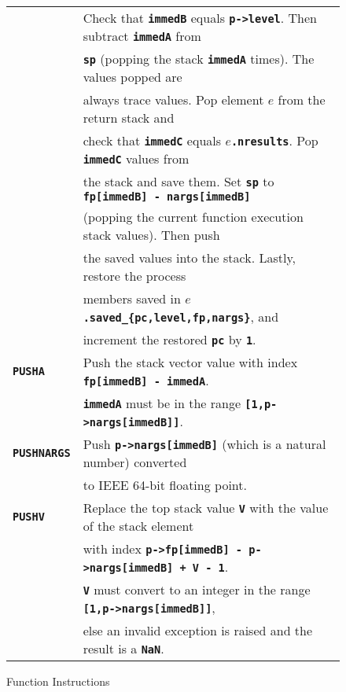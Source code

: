 \documentclass[12pt]{article}
\makeatletter
\newcommand{\TT}[1]{{\tt \bfseries #1}}
\newcommand{\ttkey}[1]{\TT{#1}\index{#1@{\tt #1}}}
\newlength{\figurewidth}
\newenvironment{boxedfigure}[1][!btp]%
	{\begin{figure*}[#1]
	 \begin{lrbox}{\figurebox}
	 \begin{minipage}{\figurewidth}

	 \vspace*{1ex}}%
	{
	 \vspace*{1ex}

	 \end{minipage}
	 \end{lrbox}

	 \centering
	 \fbox{\hspace*{0.1in}\usebox{\figurebox}\hspace*{0.1in}}
	 \end{figure*}}
\makeatother
\begin{document}
\begin{boxedfigure}
\begin{center}
\begin{tabular}{|l|l|}
    & Check that \TT{immedB} equals \TT{p->level}.  Then subtract
      \TT{immedA} from \\
    & \TT{sp} (popping the stack \TT{immedA} times).  The
      values popped are \\
    & always trace values.  Pop element $e$ from the
      return stack and \\
    & check that \TT{immedC} equals \TT{$e$.nresults}.  Pop \TT{immedC}
      values from \\
    & the stack and save them.  Set \TT{sp} to
      \TT{fp[immedB] - nargs[immedB]} \\
    & (popping the current function execution stack values).   Then push \\
    & the saved values into the stack.  Lastly, restore the process \\
    & members saved in \TT{$e$.saved\_\{pc,level,fp,nargs\}}, and \\
    & increment the restored \TT{pc} by \TT{1}.
\\\hline
\ttkey{PUSHA}
    & Push the stack vector value with index \TT{fp[immedB] - immedA}. \\
    & \TT{immedA} must be 
      in the range \TT{[1,p->nargs[immedB]]}.
\\\hline
\ttkey{PUSHNARGS}
    & Push \TT{p->nargs[immedB]} (which is a natural number)
      converted \\
    & to IEEE 64-bit floating point.
\\\hline
\ttkey{PUSHV}
    & Replace the top stack value \TT{V} with the value of the stack element \\
    & with index \TT{p->fp[immedB] - p->nargs[immedB] + V - 1}. \\ 
    & \TT{V} must convert to an integer in the
      range \TT{[1,p->nargs[immedB]]}, \\
    & else an invalid exception is raised and the result is a \TT{NaN}.
\\\hline
\end{tabular}
\end{center}
\caption{Function Instructions}
\label{FUNCTION-INSTRUCTIONS}
\end{boxedfigure}

\clearpage
\end{document}
